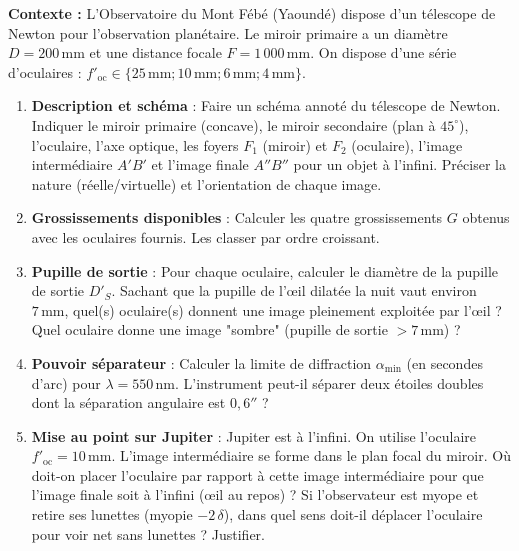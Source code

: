 \documentclass[11pt]{article}
\begin{document}
\begin{exercice}
\textbf{Contexte :} L'Observatoire du Mont Fébé (Yaoundé) dispose d'un télescope de Newton pour l'observation planétaire. Le miroir primaire a un diamètre $D = 200\,\text{mm}$ et une distance focale $F = 1\,000\,\text{mm}$. On dispose d'une série d'oculaires : $f'_{\text{oc}} \in \{25\,\text{mm}; 10\,\text{mm}; 6\,\text{mm}; 4\,\text{mm}\}$.
\begin{enumerate}
    \item \textbf{Description et schéma} : Faire un schéma annoté du télescope de Newton. Indiquer le miroir primaire (concave), le miroir secondaire (plan à $45^\circ$), l'oculaire, l'axe optique, les foyers $F_1$ (miroir) et $F_2$ (oculaire), l'image intermédiaire $A'B'$ et l'image finale $A''B''$ pour un objet à l'infini. Préciser la nature (réelle/virtuelle) et l'orientation de chaque image.
    \item \textbf{Grossissements disponibles} : Calculer les quatre grossissements $G$ obtenus avec les oculaires fournis. Les classer par ordre croissant.
    \item \textbf{Pupille de sortie} : Pour chaque oculaire, calculer le diamètre de la pupille de sortie $D'_S$. Sachant que la pupille de l'œil dilatée la nuit vaut environ $7\,\text{mm}$, quel(s) oculaire(s) donnent une image pleinement exploitée par l'œil ? Quel oculaire donne une image "sombre" (pupille de sortie $> 7\,\text{mm}$) ?
    \item \textbf{Pouvoir séparateur} : Calculer la limite de diffraction $\alpha_{\min}$ (en secondes d'arc) pour $\lambda = 550\,\text{nm}$. L'instrument peut-il séparer deux étoiles doubles dont la séparation angulaire est $0,6''$ ?
    \item \textbf{Mise au point sur Jupiter} : Jupiter est à l'infini. On utilise l'oculaire $f'_{\text{oc}} = 10\,\text{mm}$. L'image intermédiaire se forme dans le plan focal du miroir. Où doit-on placer l'oculaire par rapport à cette image intermédiaire pour que l'image finale soit à l'infini (œil au repos) ? Si l'observateur est myope et retire ses lunettes (myopie $-2\,\delta$), dans quel sens doit-il déplacer l'oculaire pour voir net sans lunettes ? Justifier.
\end{enumerate}
\end{exercice}
\end{document}
